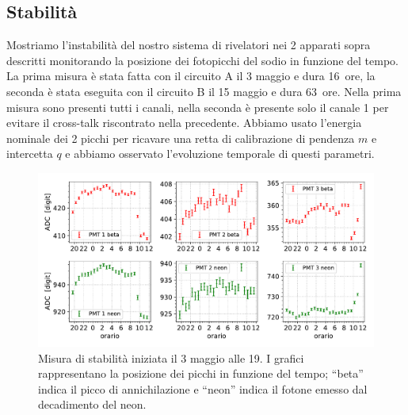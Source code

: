 \subsection{Stabilità}

Mostriamo l'instabilità del nostro sistema di rivelatori nei 2 apparati sopra descritti monitorando la posizione dei fotopicchi del sodio in funzione del tempo.
La prima misura è stata fatta con il circuito A il 3 maggio e dura \SI{16}{ore}, la seconda  è stata eseguita con il circuito B il 15 maggio e dura \SI{63}{ore}.
Nella prima misura sono presenti tutti i canali, nella seconda è presente solo il canale 1 per evitare il cross-talk riscontrato nella precedente.
Abbiamo usato l'energia nominale dei 2 picchi per ricavare una retta di calibrazione\footnotemark
{}
di pendenza $m$ e intercetta $q$ e abbiamo osservato l'evoluzione temporale di questi parametri.

\begin{figure}[h]
\centering
\includegraphics[width=\textwidth]{immagini/0503_picchi}
\caption{Misura di stabilità iniziata il 3 maggio alle 19. I grafici rappresentano la posizione dei picchi in funzione del tempo; ``beta'' indica il picco di annichilazione e ``neon'' indica il fotone emesso dal decadimento del neon.}
\label{picchi1}
\end{figure}

